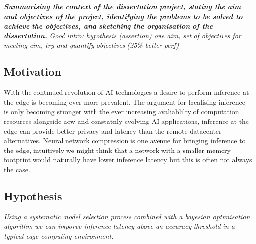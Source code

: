 \documentclass[../D1.tex]{subfiles}
\begin{document}
\emph{\textbf{Summarising the context of the dissertation project, stating the aim and objectives of the project, 
identifying the problems to be solved to achieve the objectives, and sketching the organisation of the dissertation.}}
\emph{Good intro: hypothesis (assertion) one aim, set of objectives for meeting aim, try and quantify objectives (25\% better perf)}
\subsection{Motivation}
With the continued revolution of AI technologies a desire to perform inference at the edge is becoming ever more prevalent.
The argument for localising inference is only becoming stronger with the ever increasing avaliablilty of computation resources alongside new and constatnly evolving AI applications, inference at the edge can provide better privacy and latency than the remote datacenter alternatives.
Neural network compression is one avenue for bringing inference to the edge, intuitively we might think that a network with a smaller memory footprint would naturally have lower inference latency but this is often not always the case.


\subsection{Hypothesis}
\emph{Using a systematic model selection process combined with a bayesian optimisation algorithm we can imporve inference latency above an accuracy threshold in a typical edge computing environment.}
\end{document}
